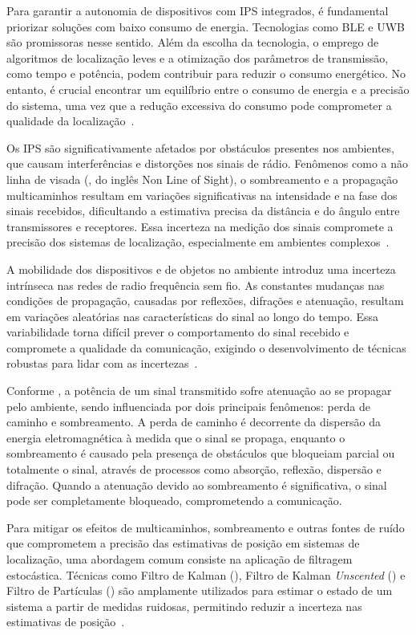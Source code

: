 Para garantir a autonomia de dispositivos com IPS integrados, é fundamental priorizar soluções com baixo consumo de energia. Tecnologias como BLE e UWB são promissoras nesse sentido. Além da escolha da tecnologia, o emprego de algoritmos de localização leves e a otimização dos parâmetros de transmissão, como tempo e potência, podem contribuir para reduzir o consumo energético. No entanto, é crucial encontrar um equilíbrio entre o consumo de energia e a precisão do sistema, uma vez que a redução excessiva do consumo pode comprometer a qualidade da localização~\cite{Yao2020, Liu2024, Farahsari2022}.

Os IPS são significativamente afetados por obstáculos presentes nos ambientes, que causam interferências e distorções nos sinais de rádio.  Fenômenos como a não linha de visada (, do inglês Non Line of Sight), o sombreamento e a propagação multicaminhos resultam em variações significativas na intensidade e na fase dos sinais recebidos, dificultando a estimativa precisa da distância e do ângulo entre transmissores e receptores. Essa incerteza na medição dos sinais compromete a precisão dos sistemas de localização, especialmente em ambientes complexos~\cite{Hayward2022}.

A mobilidade dos dispositivos e de objetos no ambiente introduz uma incerteza intrínseca nas redes de radio frequência sem fio. As constantes mudanças nas condições de propagação, causadas por reflexões, difrações e atenuação, resultam em variações aleatórias nas características do sinal ao longo do tempo. Essa variabilidade torna difícil prever o comportamento do sinal recebido e compromete a qualidade da comunicação, exigindo o desenvolvimento de técnicas robustas para lidar com as incertezas~\cite{Goldsmith2005}.

Conforme , a potência de um sinal transmitido sofre atenuação ao se propagar pelo ambiente, sendo influenciada por dois principais fenômenos: perda de caminho e sombreamento. A perda de caminho é decorrente da dispersão da energia eletromagnética à medida que o sinal se propaga, enquanto o sombreamento é causado pela presença de obstáculos que bloqueiam parcial ou totalmente o sinal, através de processos como absorção, reflexão, dispersão e difração. Quando a atenuação devido ao sombreamento é significativa, o sinal pode ser completamente bloqueado, comprometendo a comunicação.

Para mitigar os efeitos de multicaminhos, sombreamento e outras fontes de ruído que comprometem a precisão das estimativas de posição em sistemas de localização, uma abordagem comum consiste na aplicação de filtragem estocástica. Técnicas como Filtro de Kalman (), Filtro de Kalman \textit{Unscented} () e Filtro de Partículas () são amplamente utilizados para estimar o estado de um sistema a partir de medidas ruidosas, permitindo reduzir a incerteza nas estimativas de posição~\cite{Ullah2020}.

